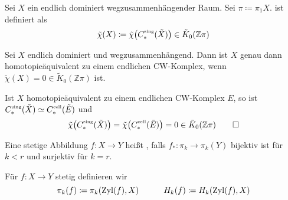 \begin{definition}[{name=[{Walls Endlichkeitshindernis}]}]
	Sei $X$ ein endlich dominiert wegzusammenhängender Raum.
	Sei $\pi \coloneqq \pi_1 X$.
	 ist definiert als 
	\[
		\tilde{\chi}(X) \coloneqq \tilde{\chi} \enbrace*{C^\sing_*(\tilde{X})} \in \tilde{K}_0(\mathbb{Z} \pi)
	\]
\end{definition}

\begin{satz}[name={Wall},label=satz:wall]
	Sei $X$ endlich dominiert und wegzusammenhängend.
	Dann ist $X$ genau dann homotopieäquivalent zu einem endlichen CW-Komplex, wenn $\tilde{\chi}(X)=0 \in \tilde{K}_0(\mathbb{Z}\pi)$ ist.
\end{satz}
\begin{beweis}[{name={der einfachen Richtung}}]
	Ist $X$ homotopieäquivalent zu einem endlichen CW-Komplex $E$, so ist $C^\sing_*(\tilde{X}) \simeq C^{\cell}_*(\tilde{E})$ und 
	\[
		\tilde{\chi} \enbrace*{C^\sing_*(\tilde{X})} = \tilde{\chi} \enbrace*{C^{\cell}_*(\tilde{E})} = 0 \in \tilde{K}_0(\mathbb{Z}\pi) \qedhere
	\]
\end{beweis}

\begin{definition}
	Eine stetige Abbildung $f \colon X \to Y$ heißt , falls $f_* \colon \pi_k \to \pi_k(Y)$ bijektiv ist für $k < r$ und surjektiv für $k =r$.
\end{definition}

\begin{definition}
	Für $f \colon X \to Y$ stetig definieren wir 
	\[
		\pi_k(f) \coloneqq \pi_k \enbrace*{\Zyl(f),X} \qquad \quad H_k(f) \coloneqq H_k \enbrace*{\Zyl(f),X}
	\]
\end{definition}

